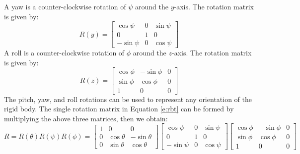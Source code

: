 A yaw is a counter-clockwise rotation of $\psi$ around the $y$-axis. The rotation matrix is given by:
\begin{equation}
R(y)=
\begin{bmatrix}
\cos\psi & 0 & \sin\psi \\
0&1&0\\
-\sin\psi &0 & \cos\psi
\end{bmatrix}
\end{equation}
A roll is a counter-clockwise rotation of $\phi$ around the $z$-axis. The rotation matrix is given by:
\begin{equation}
R(z)=
\begin{bmatrix}
\cos\phi & -\sin\phi & 0\\
\sin\phi & \cos\phi & 0\\
1&0&0
\end{bmatrix}
\end{equation}
The pitch, yaw, and roll rotations can be used to represent any orientation of the rigid body. The single rotation matrix in Equation \ref{e:rbt} can be formed by multiplying the above three matrices, then we obtain:
\begin{equation}
R=R(\theta)R(\psi)R(\phi)=
\begin{bmatrix}
1&0&0\\
0&\cos\theta & -\sin\theta \\
0&\sin\theta & \cos\theta
\end{bmatrix}
\begin{bmatrix}
\cos\psi & 0 & \sin\psi \\
0&1&0\\
-\sin\psi &0 & \cos\psi
\end{bmatrix}
\begin{bmatrix}
\cos\phi & -\sin\phi & 0\\
\sin\phi & \cos\phi & 0\\
1&0&0
\end{bmatrix}
\end{equation}

